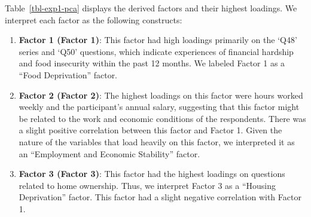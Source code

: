 \documentclass[
]{report}
\begin{document}
Table~\ref{tbl-exp1-pca} displays the derived factors and their highest
loadings. We interpret each factor as the following constructs:

\begin{enumerate}
\def\labelenumi{\arabic{enumi}.}
\item
  \textbf{Factor 1 (Factor 1)}: This factor had high loadings primarily
  on the `Q48' series and `Q50' questions, which indicate experiences of
  financial hardship and food insecurity within the past 12 months. We
  labeled Factor 1 as a ``Food Deprivation'' factor.
\item
  \textbf{Factor 2 (Factor 2)}: The highest loadings on this factor were
  hours worked weekly and the participant's annual salary, suggesting
  that this factor might be related to the work and economic conditions
  of the respondents. There was a slight positive correlation between
  this factor and Factor 1. Given the nature of the variables that load
  heavily on this factor, we interpreted it as an ``Employment and
  Economic Stability'' factor.
\item
  \textbf{Factor 3 (Factor 3)}: This factor had the highest loadings on
  questions related to home ownership. Thus, we interpret Factor 3 as a
  ``Housing Deprivation'' factor. This factor had a slight negative
  correlation with Factor 1.
\end{enumerate}
\end{document}
